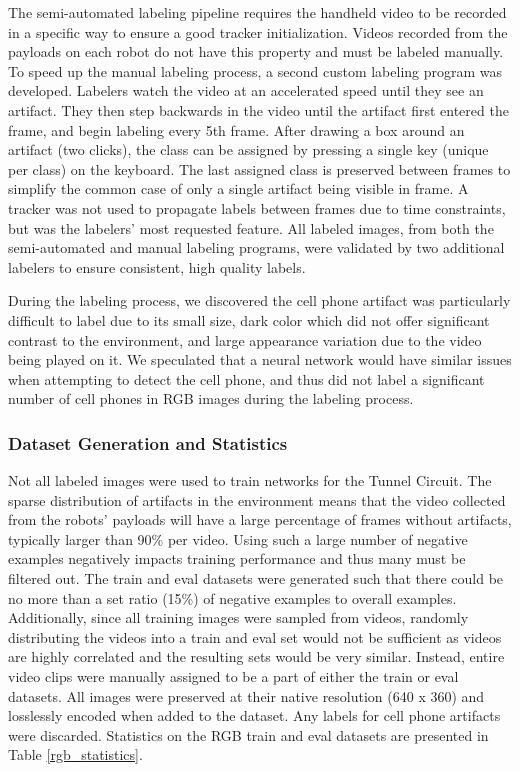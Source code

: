 The semi-automated labeling pipeline requires the handheld video to be recorded in a specific way to ensure a good tracker initialization. Videos recorded from the payloads on each robot do not have this property and must be labeled manually. To speed up the manual labeling process, a second custom labeling program was developed. Labelers watch the video at an accelerated speed until they see an artifact. They then step backwards in the video until the artifact first entered the frame, and begin labeling every 5th frame. After drawing a box around an artifact (two clicks), the class can be assigned by pressing a single key (unique per class) on the keyboard. The last assigned class is preserved between frames to simplify the common case of only a single artifact being visible in frame. A tracker was not used to propagate labels between frames due to time constraints, but was the labelers' most requested feature. All labeled images, from both the semi-automated and manual labeling programs, were validated by two additional labelers to ensure consistent, high quality labels.

During the labeling process, we discovered the cell phone artifact was particularly difficult to label due to its small size, dark color which did not offer significant contrast to the environment, and large appearance variation due to the video being played on it. We speculated that a neural network would have similar issues when attempting to detect the cell phone, and thus did not label a significant number of cell phones in RGB images during the labeling process.

\subsubsection{Dataset Generation and Statistics}

Not all labeled images were used to train networks for the Tunnel Circuit. The sparse distribution of artifacts in the environment means that the video collected from the robots' payloads will have a large percentage of frames without artifacts, typically larger than 90\% per video. Using such a large number of negative examples negatively impacts training performance and thus many must be filtered out. The train and eval datasets were generated such that there could be no more than a set ratio (15\%) of negative examples to overall examples. Additionally, since all training images were sampled from videos, randomly distributing the videos into a train and eval set would not be sufficient as videos are highly correlated and the resulting sets would be very similar. Instead, entire video clips were manually assigned to be a part of either the train or eval datasets. All images were preserved at their native resolution (640 x 360) and losslessly encoded when added to the dataset. Any labels for cell phone artifacts were discarded. Statistics on the RGB train and eval datasets are presented in Table \ref{rgb_statistics}.

